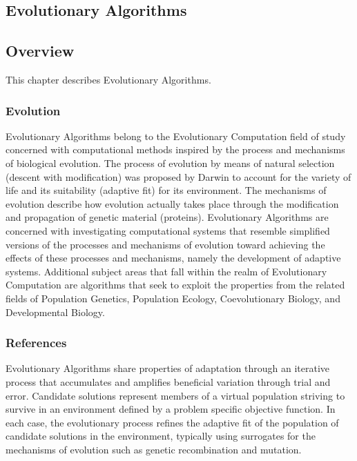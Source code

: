 

\renewcommand{\bibsection}{\subsection{\bibname}}
\begin{bibunit}

\chapter{Evolutionary Algorithms}
\label{ch:evolutionary}

\section{Overview}
This chapter describes Evolutionary Algorithms.

\subsection{Evolution}
Evolutionary Algorithms belong to the Evolutionary Computation field of study concerned with computational methods inspired by the process and mechanisms of biological evolution. 
The process of evolution by means of natural selection (descent with modification) was proposed by Darwin to account for the variety of life and its suitability (adaptive fit) for its environment. The mechanisms of evolution describe how evolution actually takes place through the modification and propagation of genetic material (proteins). 
Evolutionary Algorithms are concerned with investigating computational systems that resemble simplified versions of the processes and mechanisms of evolution toward achieving the effects of these processes and mechanisms, namely the development of adaptive systems.
Additional subject areas that fall within the realm of Evolutionary Computation are algorithms that seek to exploit the properties from the related fields of Population Genetics, Population Ecology, Coevolutionary Biology, and Developmental Biology. 

\subsection{References}
Evolutionary Algorithms share properties of adaptation through an iterative process that accumulates and amplifies beneficial variation through trial and error. Candidate solutions represent members of a virtual population striving to survive in an environment defined by a problem specific objective function. In each case, the evolutionary process refines the adaptive fit of the population of candidate solutions in the environment, typically using surrogates for the mechanisms of evolution such as genetic recombination and mutation.


\end{bibunit}

